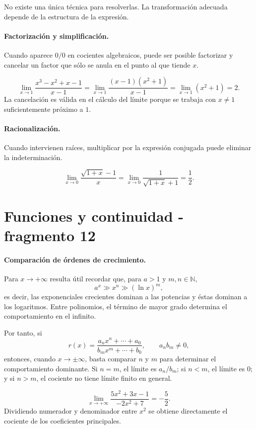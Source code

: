 No existe una única técnica para resolverlas. La transformación adecuada depende de la estructura de la expresión.

\paragraph{Factorización y simplificación.}
Cuando aparece $0/0$ en cocientes algebraicos, puede ser posible factorizar y cancelar un factor que sólo se anula en el punto al que tiende $x$.

\begin{example}
\[
\lim_{x\to1}\frac{x^3-x^2+x-1}{x-1}
=\lim_{x\to1}\frac{(x-1)(x^2+1)}{x-1}
=\lim_{x\to1}(x^2+1)=2.
\]
La cancelación es válida en el cálculo del límite porque se trabaja con $x\neq1$ suficientemente próximo a $1$.
\end{example}

\paragraph{Racionalización.}
Cuando intervienen raíces, multiplicar por la expresión conjugada puede eliminar la indeterminación.

\begin{example}
\[
\lim_{x\to0}\frac{\sqrt{1+x}-1}{x}
=\lim_{x\to0}
\frac{1}{\sqrt{1+x}+1}
=\frac12.
\]
\end{example}


\section{Funciones y continuidad - fragmento 12}
\paragraph{Comparación de órdenes de crecimiento.}
Para $x\to+\infty$ resulta útil recordar que, para $a>1$ y $m,n\in\mathbb{N}$,
\[
a^x\gg x^n\gg (\ln x)^m,
\]
es decir, las exponenciales crecientes dominan a las potencias y éstas dominan a los logaritmos. Entre polinomios, el término de mayor grado determina el comportamiento en el infinito.

Por tanto, si
\[
r(x)=\frac{a_nx^n+\cdots+a_0}{b_mx^m+\cdots+b_0},
\qquad a_n b_m\neq0,
\]
entonces, cuando $x\to\pm\infty$, basta comparar $n$ y $m$ para determinar el comportamiento dominante. Si $n=m$, el límite es $a_n/b_m$; si $n<m$, el límite es $0$; y si $n>m$, el cociente no tiene límite finito en general.

\begin{example}
\[
\lim_{x\to+\infty}\frac{5x^2+3x-1}{-2x^2+7}
=-\frac52.
\]
Dividiendo numerador y denominador entre $x^2$ se obtiene directamente el cociente de los coeficientes principales.
\end{example}

